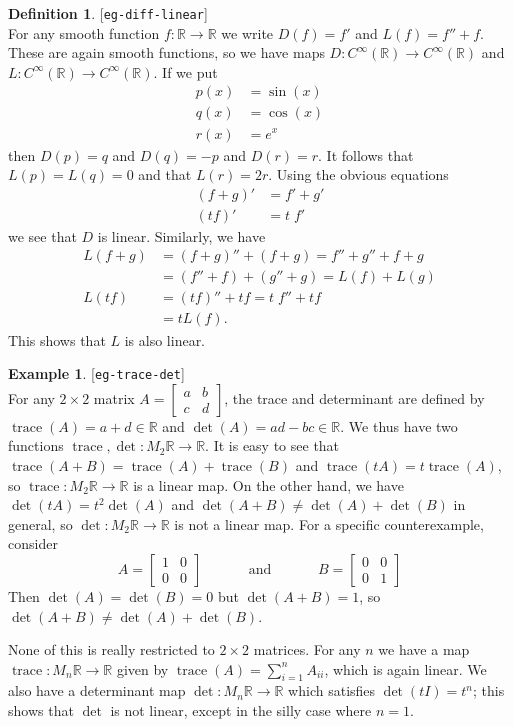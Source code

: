 \documentclass{amsart}
\newcommand{\lbl}[1]{\label{#1}\textup{[\texttt{#1}]}\ \\}
\newcommand{\lbl}{\label}
\newcommand{\R}         {{\mathbb{R}}}
\newcommand{\trc}       {\operatorname{trace}}
\newcommand{\bsm}       {\left[\begin{smallmatrix}}
\newcommand{\esm}       {\end{smallmatrix}\right]}
\newcommand{\tm}        {\times}
\newcommand{\xra}       {\xrightarrow}
\renewcommand{\:}       {\colon}
\theoremstyle{definition}
\newtheorem{definition}[theorem]{Definition}
\newtheorem{example}[theorem]{Example}
\begin{document}
\begin{definition}\lbl{eg-diff-linear}
 For any smooth function $f\:\R\xra{}\R$ we write $D(f)=f'$ and
 $L(f)=f''+f$.  These are again smooth functions, so we have maps
 $D\:C^\infty(\R)\xra{}C^\infty(\R)$ and
 $L\:C^\infty(\R)\xra{}C^\infty(\R)$.  If we put
 \begin{align*}
  p(x) &= \sin(x) \\
  q(x) &= \cos(x) \\
  r(x) &= e^x
 \end{align*}
 then $D(p)=q$ and $D(q)=-p$ and $D(r)=r$.  It follows that
 $L(p)=L(q)=0$ and that $L(r)=2r$.  Using the obvious equations
 \begin{align*}
  (f+g)' &= f' + g' \\
  (tf)'  &= t\;f'
 \end{align*}
 we see that $D$ is linear.  Similarly, we have
 \begin{align*}
  L(f+g) &= (f+g)'' + (f+g) 
          = f'' + g'' + f + g \\
         &= (f''+f) + (g''+g) 
          = L(f) + L(g) \\
  L(tf)  &= (tf)'' + tf 
          = t\; f'' + t f \\
         &= t L(f).
 \end{align*}
 This shows that $L$ is also linear.
\end{definition}

\begin{example}\lbl{eg-trace-det}
 For any $2\tm 2$ matrix $A=\bsm a & b\\ c & d\esm$, the
 trace and determinant are defined by $\trc(A)=a+d\in\R$
 and $\det(A)=ad-bc\in\R$.  We thus have two functions
 $\trc,\det\:M_2\R\xra{}\R$.  It is easy to see that
 $\trc(A+B)=\trc(A)+\trc(B)$ and
 $\trc(tA)=t\trc(A)$, so $\trc\:M_2\R\xra{}\R$ is a
 linear map.  On the other hand, we have
 $\det(tA)=t^2\det(A)$ and $\det(A+B)\neq\det(A)+\det(B)$ in
 general, so $\det\:M_2\R\xra{}\R$ is not a linear map.  For
 a specific counterexample, consider
 \[ A = \bsm 1 & 0 \\ 0 & 0 \esm 
    \hspace{3em} \text{ and } \hspace{3em}
    B = \bsm 0 & 0 \\ 0 & 1 \esm
 \]
 Then $\det(A)=\det(B)=0$ but $\det(A+B)=1$, so
 $\det(A+B)\neq\det(A)+\det(B)$.  

 None of this is really restricted to $2\tm 2$ matrices.
 For any $n$ we have a map $\trc\:M_n\R\xra{}\R$ given by
 $\trc(A)=\sum_{i=1}^nA_{ii}$, which is again linear.  We
 also have a determinant map $\det\:M_n\R\xra{}\R$ which
 satisfies $\det(tI)=t^n$; this shows that $\det$ is not
 linear, except in the silly case where $n=1$.
\end{example}
\end{document}
